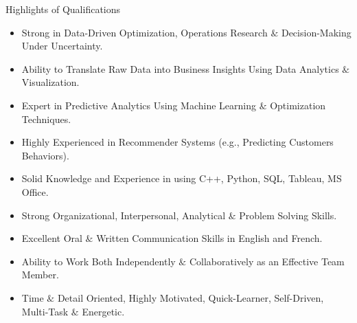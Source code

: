 \documentclass{resume} %
\begin{document}
\begin{rSection}{Highlights of Qualifications}
{
\begin{itemize}
\item Strong in Data-Driven Optimization, Operations Research $\&$ Decision-Making Under Uncertainty.
\item Ability to Translate Raw Data into Business Insights Using Data Analytics $\&$ Visualization.
\item Expert in Predictive Analytics Using Machine Learning $\&$ Optimization Techniques.
\item Highly Experienced in Recommender Systems (e.g., Predicting Customers Behaviors).
 \item Solid Knowledge and Experience in using C++, Python, SQL, Tableau, MS Office.
\item Strong Organizational, Interpersonal, Analytical $\&$ Problem Solving Skills.
 \item Excellent Oral $\&$ Written Communication Skills in English and French.
 \item Ability to Work Both Independently $\&$ Collaboratively as an Effective Team Member.
\item Time $\&$ Detail Oriented, Highly Motivated, Quick-Learner, Self-Driven, Multi-Task $\&$ Energetic.
\end{itemize}
}
\end{rSection}
\end{document}
